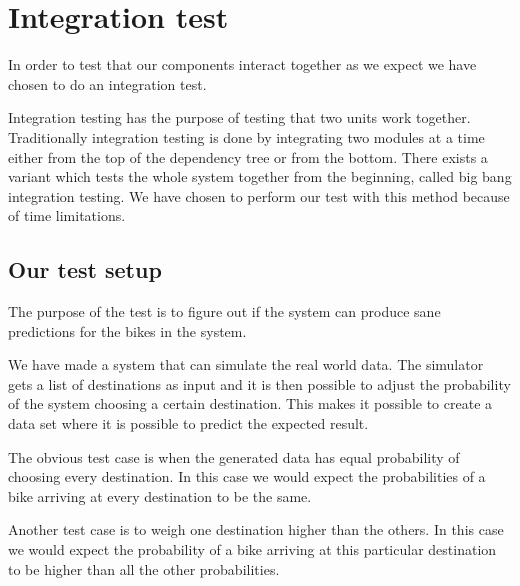 \section{Integration test}

In order to test that our components interact together as we expect we have chosen to do an integration test.

Integration testing has the purpose of testing that two units work together. 
Traditionally integration testing is done by integrating two modules at a time either from the top of the dependency tree or from the bottom.
There exists a variant which tests the whole system together from the beginning, called big bang integration testing.
We have chosen to perform our test with this method because of time limitations. \cite{inttest}

\subsection{Our test setup}
The purpose of the test is to figure out if the system can produce sane predictions for the bikes in the system.

We have made a system that can simulate the real world data. 
The simulator gets a list of destinations as input and it is then possible to adjust the probability of the system choosing a certain destination. 
This makes it possible to create a data set where it is possible to predict the expected result.

The obvious test case is when the generated data has equal probability of choosing every destination. 
In this case we would expect the probabilities of a bike arriving at every destination to be the same.

Another test case is to weigh one destination higher than the others.
In this case we would expect the probability of a bike arriving at this particular destination to be higher than all the other probabilities.